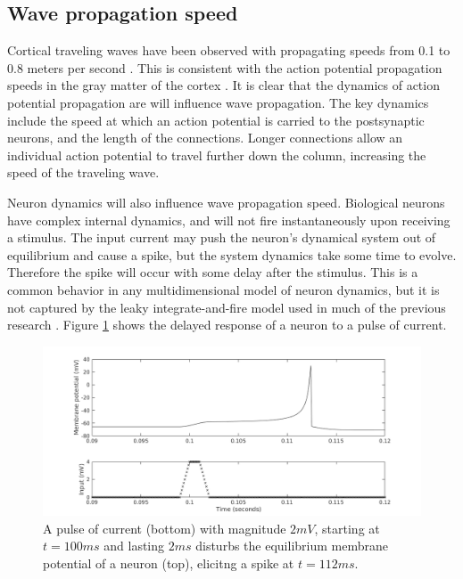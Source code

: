 \documentclass[a4paper,11pt]{article}
\begin{document}
\FloatBarrier

\subsection{Wave propagation speed} \label{sub:propagation_speed}
Cortical traveling waves have been observed with propagating speeds from 0.1 to 0.8 meters per second \cite{sato2012}.
This is consistent with the action potential propagation speeds in the gray matter of the cortex \cite{muller2018}.
It is clear that the dynamics of action potential propagation are will influence wave propagation.
The key dynamics include the speed at which an action potential is carried to the postsynaptic neurons, and the length of the connections.
Longer connections allow an individual action potential to travel further down the column, increasing the speed of the traveling wave.

Neuron dynamics will also influence wave propagation speed.
Biological neurons have complex internal dynamics, and will not fire instantaneously upon receiving a stimulus.
The input current may push the neuron's dynamical system out of equilibrium and cause a spike, but the system dynamics take some time to evolve.
Therefore the spike will occur with some delay after the stimulus.
This is a common behavior in any multidimensional model of neuron dynamics, but it is not captured by the leaky integrate-and-fire model used in much of the previous research \cite{keane2015}\cite{senk2020}.
Figure \ref{fig:delay_neuronstep} shows the delayed response of a neuron to a pulse of current.
\begin{figure}[!htb]
 \caption{ A pulse of current (bottom) with magnitude $2 mV$, starting at $t=100 ms$ and lasting $2 ms$ disturbs the equilibrium membrane potential of a neuron (top), elicitng a spike at $t=112 ms$. }
 \label{fig:delay_neuronstep}
 \centering
   \includegraphics[width=\textwidth]{fig/WaveSpeed_NeuronStepTest}
\end{figure}
\end{document}
